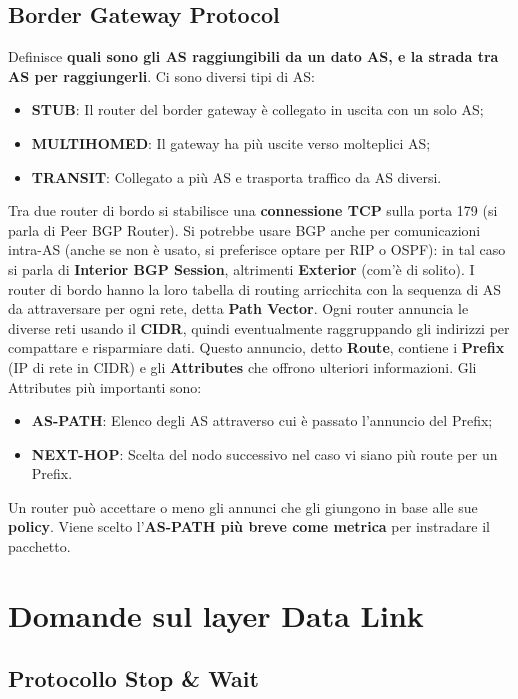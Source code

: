 \documentclass[12pt]{article}
\begin{document}
\subsection{Border Gateway Protocol}

Definisce \textbf{quali sono gli AS raggiungibili da un dato AS, e la strada tra AS per raggiungerli}. Ci sono diversi tipi di AS:
\begin{itemize}
    \item \textbf{STUB}: Il router del border gateway è collegato in uscita con un solo AS;
    \item \textbf{MULTIHOMED}: Il gateway ha più uscite verso molteplici AS;
    \item \textbf{TRANSIT}: Collegato a più AS e trasporta traffico da AS diversi.
\end{itemize}
Tra due router di bordo si stabilisce una \textbf{connessione TCP} sulla porta 179 (si parla di Peer BGP Router). Si potrebbe usare BGP anche per comunicazioni intra-AS (anche se non è usato, si preferisce optare per RIP o OSPF): in tal caso si parla di \textbf{Interior BGP Session}, altrimenti \textbf{Exterior} (com'è di solito). I router di bordo hanno la loro tabella di routing arricchita con la sequenza di AS da attraversare per ogni rete, detta \textbf{Path Vector}. Ogni router annuncia le diverse reti usando il \textbf{CIDR}, quindi eventualmente raggruppando gli indirizzi per compattare e risparmiare dati. Questo annuncio, detto \textbf{Route}, contiene i \textbf{Prefix} (IP di rete in CIDR) e gli \textbf{Attributes} che offrono ulteriori informazioni. Gli Attributes più importanti sono:
\begin{itemize}
    \item \textbf{AS-PATH}: Elenco degli AS attraverso cui è passato l'annuncio del Prefix;
    \item \textbf{NEXT-HOP}: Scelta del nodo successivo nel caso vi siano più route per un Prefix.
\end{itemize}
Un router può accettare o meno gli annunci che gli giungono in base alle sue \textbf{policy}. Viene scelto l'\textbf{AS-PATH più breve come metrica} per instradare il pacchetto.

\section{Domande sul layer Data Link}

\subsection{Protocollo Stop \& Wait}
\end{document}
